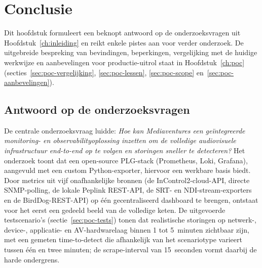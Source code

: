 
\chapter{Conclusie}%
\label{ch:conclusie}

Dit hoofdstuk formuleert een beknopt antwoord op de onderzoeksvragen uit Hoofdstuk~\ref{ch:inleiding} en reikt enkele pistes aan voor verder onderzoek. De uitgebreide bespreking van bevindingen, beperkingen, vergelijking met de huidige werkwijze en aanbevelingen voor productie-uitrol staat in Hoofdstuk~\ref{ch:poc} (secties~\ref{sec:poc-vergelijking}, \ref{sec:poc-lessen}, \ref{sec:poc-scope} en~\ref{sec:poc-aanbevelingen}).

\section{Antwoord op de onderzoeksvragen}
\label{sec:conclusie-antwoord}

De centrale onderzoeksvraag luidde: \emph{Hoe kan Mediaventures een geïntegreerde monitoring- en observabilityoplossing inzetten om de volledige audiovisuele infrastructuur end-to-end op te volgen en storingen sneller te detecteren?} Het onderzoek toont dat een open-source PLG-stack (Prometheus, Loki, Grafana), aangevuld met een custom Python-exporter, hiervoor een werkbare basis biedt. Door metrics uit vijf onafhankelijke bronnen (de InControl2-cloud-API, directe SNMP-polling, de lokale Peplink REST-API, de SRT- en NDI-stream-exporters en de BirdDog-REST-API) op één gecentraliseerd dashboard te brengen, ontstaat voor het eerst een gedeeld beeld van de volledige keten. De uitgevoerde testscenario's (sectie~\ref{sec:poc-tests}) tonen dat realistische storingen op netwerk-, device-, applicatie- en AV-hardwarelaag binnen 1 tot 5~minuten zichtbaar zijn, met een gemeten time-to-detect die afhankelijk van het scenariotype varieert tussen één en twee minuten; de scrape-interval van 15~seconden vormt daarbij de harde ondergrens.

